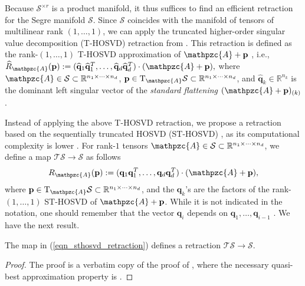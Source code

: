 \documentclass[a4paper,10pt,final]{siamart1116}
\newcommand{\Var}[1]{\mathcal{#1}}
\newcommand{\tensor}[1]{\mathpzc{#1}}
\newcommand{\vect}[1]{\mathbf{#1}}
\newcommand{\Tang}[2]{\mathrm{T}_{#1} {#2}}
\newcommand{\R}{\mathbb{R}}
\newcommand{\refeqn}[1]{{(\ref{#1})}}
\numberwithin{equation}{section}
\numberwithin{figure}{section}
\numberwithin{table}{section}
\numberwithin{theorem}{section}
\begin{document}
Because $\Var{S}^{\times r}$ is a product manifold, it thus suffices to find an efficient retraction for the Segre manifold $\Var{S}$.
Since $\Var{S}$ coincides with the manifold of tensors of multilinear rank $(1,\ldots,1)$, we can apply the truncated higher-order singular value decomposition (T-HOSVD) retraction from \cite[Proposition 2.3]{KSV2014}. This retraction is defined as the rank-$(1,\ldots,1)$ T-HOSVD approximation of $\tensor{A} + \vect{p}$ \cite{Lathauwer2000}, i.e.,
\(
\widehat{R}_{\tensor{A}}( \vect{p} ) := (\widehat{\vect{q}}_1 \widehat{\vect{q}}_1^T, \ldots, \widehat{\vect{q}}_d \widehat{\vect{q}}_d^T) \cdot (\tensor{A} + \vect{p}),
\)
where $\tensor{A} \in \Var{S} \subset \R^{n_1 \times \cdots \times n_d}$, $\vect{p} \in \Tang{\tensor{A}}{\Var{S}} \subset \R^{n_1 \times \cdots \times n_d}$, and $\widehat{\vect{q}}_k \in \R^{n_k}$ is the dominant left singular vector of the \textit{standard flattening} $(\tensor{A} + \vect{p})_{(k)}$ \cite{Lathauwer2000}.

Instead of applying the above T-HOSVD retraction, we propose a retraction based on the sequentially truncated HOSVD (ST-HOSVD) \cite{Hackbusch2012,VVM2012}, as its computational complexity is lower \cite{VVM2012}.
For rank-$1$ tensors $\tensor{A} \in \Var{S} \subset \R^{n_1 \times \cdots \times n_d}$, we define a map $\Var{T}\Var{S} \to \Var{S}$ as follows
\begin{align} \label{eqn_sthosvd_retraction}
 R_{\tensor{A}}( \vect{p} ) := (\vect{q}_1 \vect{q}_1^T, \ldots, \vect{q}_d \vect{q}_d^T) \cdot (\tensor{A} + \vect{p}),
\end{align}
where $\vect{p} \in \Tang{\tensor{A}}{\Var{S}} \subset \R^{n_1 \times \cdots \times n_d}$, and the $\vect{q}_k$'s are the factors of the rank-$(1,\ldots,1)$ ST-HOSVD of $\tensor{A} + \vect{p}$. While it is not indicated in the notation, one should remember that the vector $\vect{q}_i$ depends on $\vect{q}_1, \ldots, \vect{q}_{i-1}$ \cite{VVM2012}. We have the next result.

\begin{lemma} \label{lem_sthosvd_retraction}
The map in \refeqn{eqn_sthosvd_retraction} defines a retraction $\Var{T}\Var{S} \to \Var{S}$.
\end{lemma}
\begin{proof}
 The proof is a verbatim copy of the proof of \cite[Proposition 2.3]{KSV2014}, where the necessary quasi-best approximation property is \cite[Theorem 10.5]{Hackbusch2012}.
\end{proof}
\end{document}

